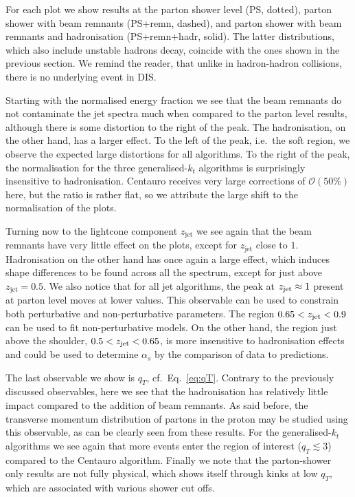 For each plot we show results at the parton shower level (PS, dotted), parton shower with beam remnants (PS+remn, dashed), and parton shower with beam remnants and hadronisation (PS+remn+hadr, solid). The latter distributions, which also include unstable hadrons decay, coincide with the ones shown in the previous section. 
%
We remind the reader, that unlike in hadron-hadron
collisions, there is no underlying event in DIS. 

Starting with the normalised energy fraction we see that the beam
remnants do not contaminate the jet spectra much when compared to the parton
level results, although there is some distortion to the right of the peak. 
%
The hadronisation, on the other hand, has a larger effect. 
%
To the left of the peak, i.e.\ the soft region, we observe the expected
large distortions for all algorithms. 
%
To the right of the peak, the normalisation for the three generalised-$k_t$ 
algorithms is surprisingly insensitive to hadronisation.
%
Centauro receives very large corrections of $\mathcal{O}(50\%)$ here, but the
ratio is rather flat, so we attribute the large shift to the
normalisation of the plots. 

Turning now to the lightcone component $z_{\mathrm{jet}}$ we see again
that the beam remnants have very little effect on the plots, except
for $z_{\mathrm{jet}}$ close to $1$. 
%
Hadronisation on the other hand has once again a large effect, which induces shape differences to be
found across all the spectrum, except for just above $z_{\mathrm{jet}}=0.5$.
%
We also notice that for all jet algorithms, the peak at $z_{\rm jet}\approx 1$ present at parton level moves at lower values.
%
This observable can be used to constrain both perturbative and non-perturbative parameters.
%
The region $0.65<z_{\rm jet}<0.9$ can be used to fit non-perturbative
models.  
%
On the other hand, the region just above the shoulder, $0.5 < z_{\rm jet} < 0.65$, 
is more insensitive to hadronisation effects and could
be used to determine $\alpha_s$ by the comparison of data
to predictions.

The last observable we show is $q_T$, cf.\ Eq.~\eqref{eq:qT}. 
%
Contrary to the previously discussed observables, 
here we see that the hadronisation has relatively little impact
compared to the addition of beam remnants. 
%
As said before, the transverse momentum distribution of
partons in the proton may be studied using this observable,
as can be clearly seen from these results. 
%
For the generalised-$k_t$ algorithms we see again that more
events enter the region of interest ($q_T \lesssim 3$) compared
to the Centauro algorithm.
%
Finally we note that the parton-shower only results are not fully
physical, which shows itself through kinks at low $q_T$, which are
associated with various shower cut offs. 

